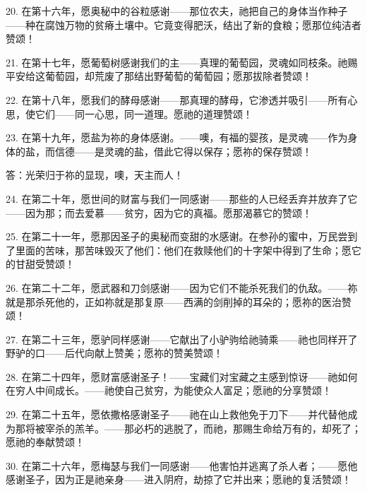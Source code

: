 20. 在第十六年，愿奥秘中的谷粒感谢——那位农夫，祂把自己的身体当作种子——种在腐蚀万物的贫瘠土壤中。它竟变得肥沃，结出了新的食粮；愿那位纯洁者赞颂！\par

21. 在第十七年，愿葡萄树感谢我们的主——真理的葡萄园，灵魂如同枝条。祂赐平安给这葡萄园，却荒废了那结出野葡萄的葡萄园；愿那拔除者赞颂！\par

22. 在第十八年，愿我们的酵母感谢——那真理的酵母，它渗透并吸引——所有心思，使它们——同一心思，同一道理。愿祂的道理赞颂！\par

23. 在第十九年，愿盐为祢的身体感谢。——噢，有福的婴孩，是灵魂——作为身体的盐，而信德——是灵魂的盐，借此它得以保存；愿祢的保存赞颂！\par

答：光荣归于祢的显现，噢，天主而人！\par

24. 在第二十年，愿世间的财富与我们一同感谢——那些的人已经丢弃并放弃了它——因为那；而去爱慕——贫穷，因为它的真福。愿那渴慕它的赞颂！\par

25. 在第二十一年，愿那因圣子的奥秘而变甜的水感谢。在参孙的蜜中，万民尝到了里面的苦味，那苦味毁灭了他们：他们在救赎他们的十字架中得到了生命；愿它的甘甜受赞颂！\par

26. 在第二十二年，愿武器和刀剑感谢——因为它们不能杀死我们的仇敌。——祢就是那杀死他的，正如祢就是那复原——西满的剑削掉的耳朵的；愿祢的医治赞颂！\par

27. 在第二十三年，愿驴同样感谢——它献出了小驴驹给祂骑乘——祂也同样开了野驴的口——后代向献上赞美；愿祢的赞美赞颂！\par

28. 在第二十四年，愿财富感谢圣子！——宝藏们对宝藏之主感到惊讶——祂如何在穷人中间成长。——祂使自己贫穷，为能使众人富足；愿祂的分享赞颂！\par

29. 在第二十五年，愿依撒格感谢圣子——祂在山上救他免于刀下——并代替他成为那将被宰杀的羔羊。——那必朽的逃脱了，而祂，那赐生命给万有的，却死了；愿祂的奉献赞颂！\par

30. 在第二十六年，愿梅瑟与我们一同感谢——他害怕并逃离了杀人者；——愿他感谢圣子，因为正是祂亲身——进入阴府，劫掠了它并出来；愿祂的复活赞颂！\par

